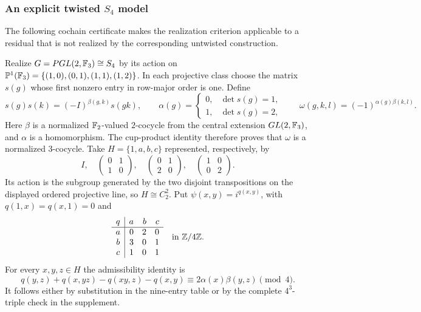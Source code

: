 \subsubsection{An explicit twisted $S_4$ model}
The following cochain certificate makes the realization criterion
applicable to a residual that is not realized by the corresponding
untwisted construction.

Realize $G=PGL(2,\mathbb F_3)\cong S_4$ by its action on
$\mathbb P^1(\mathbb F_3)=\{(1,0),(0,1),(1,1),(1,2)\}$.
In each projective class choose the matrix $s(g)$ whose first nonzero
entry in row-major order is one. Define
\[
 s(g)s(k)=(-I)^{\beta(g,k)}s(gk),\qquad
 \alpha(g)=\begin{cases}0,&\det s(g)=1,\\1,&\det s(g)=2,\end{cases}
 \qquad
 \omega(g,k,l)=(-1)^{\alpha(g)\beta(k,l)}.
\]
Here $\beta$ is a normalized $\mathbb F_2$-valued $2$-cocycle from the central
extension $GL(2,\mathbb F_3)$, and $\alpha$ is a homomorphism. The cup-product
identity therefore proves that $\omega$ is a normalized $3$-cocycle.
Take $H=\{1,a,b,c\}$ represented, respectively, by
\[
 I,\quad
 \begin{pmatrix}0&1\\1&0\end{pmatrix},\quad
 \begin{pmatrix}0&1\\2&0\end{pmatrix},\quad
 \begin{pmatrix}1&0\\0&2\end{pmatrix}.
\]
Its action is the subgroup generated by the two disjoint transpositions
on the displayed ordered projective line, so $H\cong C_2^2$.
Put $\psi(x,y)=i^{q(x,y)}$, with $q(1,x)=q(x,1)=0$ and
\begin{equation}\label{eq:s4-cochain}
 \begin{array}{c|rrr}
 q&a&b&c\\\hline
 a&0&2&0\\
 b&3&0&1\\
 c&1&0&1
 \end{array}\quad\text{in }\mathbb Z/4\mathbb Z.
\end{equation}
For every $x,y,z\in H$ the admissibility identity is
\[
 q(y,z)+q(x,yz)-q(xy,z)-q(x,y)
 \equiv 2\alpha(x)\beta(y,z)\pmod4.
\]
It follows either by substitution in the nine-entry table or by the
complete $4^3$-triple check in the supplement.


